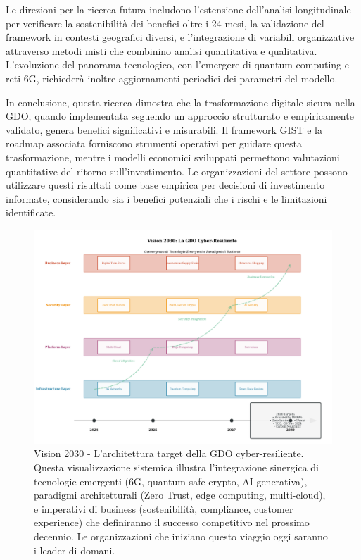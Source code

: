 Le direzioni per la ricerca futura includono l'estensione dell'analisi longitudinale per verificare la sostenibilità dei benefici oltre i 24 mesi, la validazione del framework in contesti geografici diversi, e l'integrazione di variabili organizzative attraverso metodi misti che combinino analisi quantitativa e qualitativa. L'evoluzione del panorama tecnologico, con l'emergere di quantum computing e reti 6G, richiederà inoltre aggiornamenti periodici dei parametri del modello.

In conclusione, questa ricerca dimostra che la trasformazione digitale sicura nella GDO, quando implementata seguendo un approccio strutturato e empiricamente validato, genera benefici significativi e misurabili. Il framework GIST e la roadmap associata forniscono strumenti operativi per guidare questa trasformazione, mentre i modelli economici sviluppati permettono valutazioni quantitative del ritorno sull'investimento. Le organizzazioni del settore possono utilizzare questi risultati come base empirica per decisioni di investimento informate, considerando sia i benefici potenziali che i rischi e le limitazioni identificate.

\begin{figure}[htbp]
\centering
\includegraphics[width=\textwidth]{thesis_figures/cap5/figura_5_4_vision_2030.pdf}
\caption{Vision 2030 - L'architettura target della GDO cyber-resiliente. Questa visualizzazione sistemica illustra l'integrazione sinergica di tecnologie emergenti (6G, quantum-safe crypto, AI generativa), paradigmi architetturali (Zero Trust, edge computing, multi-cloud), e imperativi di business (sostenibilità, compliance, customer experience) che definiranno il successo competitivo nel prossimo decennio. Le organizzazioni che iniziano questo viaggio oggi saranno i leader di domani.}
\label{fig:vision_2030}
\end{figure}

\printbibliography[
    heading=subbibliography,
    title={Riferimenti Bibliografici del Capitolo 5}
]

% 